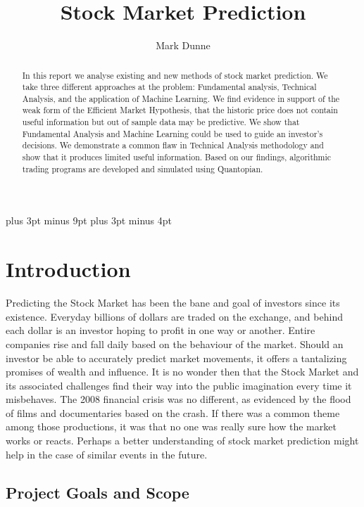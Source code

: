 \documentclass{report}
\title{Stock Market Prediction}
\author{Mark Dunne}
\begin{document}
\lstset{language=Python}    
\belowdisplayskip=12pt plus 3pt minus 9pt
\belowdisplayshortskip=7pt plus 3pt minus 4pt

\maketitle

\begin{abstract}

In this report we analyse existing and new methods of stock market prediction. We take three different approaches at the problem: Fundamental analysis, Technical Analysis, and the application of Machine Learning. We find evidence in support of the weak form of the Efficient Market Hypothesis, that the historic price does not contain useful information but out of sample data may be predictive. We show that Fundamental Analysis and Machine Learning could be used to guide an investor's decisions. We demonstrate a common flaw in Technical Analysis methodology and show that it produces limited useful information. Based on our findings, algorithmic trading programs are developed and simulated using Quantopian.

\end{abstract}

\tableofcontents

\chapter{Introduction}

Predicting the Stock Market has been the bane and goal of investors since its existence. Everyday billions of dollars are traded on the exchange, and behind each dollar is an investor hoping to profit in one way or another. Entire companies rise and fall daily based on the behaviour of the market. Should an investor be able to accurately predict market movements, it offers a tantalizing promises of wealth and influence. It is no wonder then that the Stock Market and its associated challenges find their way into the public imagination every time it misbehaves. The 2008 financial crisis was no different, as evidenced by the flood of films and documentaries based on the crash. If there was a common theme among those productions, it was that no one was really sure how the market works or reacts. Perhaps a better understanding of stock market prediction might help in the case of similar events in the future.

\section{Project Goals and Scope}
\end{document}
